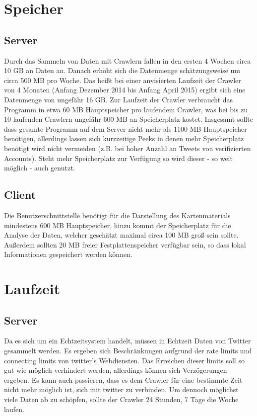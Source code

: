 \section{Speicher}
\subsection{Server}
Durch das Sammeln von Daten mit Crawlern fallen in den ersten 4 Wochen circa 10 GB an Daten an. Danach erhöht sich die Datenmenge schätzungsweise um circa 500 MB pro Woche. Das heißt bei einer anvisierten Laufzeit der Crawler von 4 Monaten (Anfang Dezember 2014 bis Anfang April 2015) ergibt sich eine Datenmenge von ungefähr 16 GB.
Zur Laufzeit der Crawler verbraucht das Programm in etwa 60 MB Hauptspeicher pro laufendem Crawler, was bei bis zu 10 laufenden Crawlern ungefähr 600 MB an Speicherplatz kostet.
Insgesamt sollte dass gesamte Programm auf dem Server nicht mehr als 1100 MB Hauptspeicher benötigen, allerdings lassen sich kurzzeitige Peeks in denen mehr Speicherplatz benötigt wird nicht vermeiden (z.B. bei hoher Anzahl an Tweets von verifizierten Accounts). Steht mehr Speicherplatz zur Verfügung so wird dieser - so weit möglich - auch genutzt.
\subsection{Client}
Die Benutzerschnittstelle benötigt für die Darstellung des Kartenmaterials mindestens 600 MB Hauptspeicher, hinzu kommt der Speicherplatz für die Analyse der Daten, welcher geschätzt maximal circa 100 MB groß sein sollte.
Außerdem sollten 20 MB freier Festplattenspeicher verfügbar sein, so dass lokal Informationen gespeichert werden können.
\section{Laufzeit}
\subsection{Server}
Da es sich um ein Echtzeitsystem handelt, müssen in Echtzeit Daten von Twitter gesammelt werden. Es ergeben sich Beschränkungen aufgrund der rate limits und connecting limits von twitter's Webdiensten. Das Erreichen dieser limits soll so gut wie möglich verhindert werden, allerdings können sich Verzögerungen ergeben. Es kann auch passieren, dass es dem Crawler für eine bestimmte Zeit nicht mehr möglich ist, sich mit twitter zu verbinden. Um dennoch möglichst viele Daten ab zu schöpfen, sollte der Crawler 24 Stunden, 7 Tage die Woche laufen.
